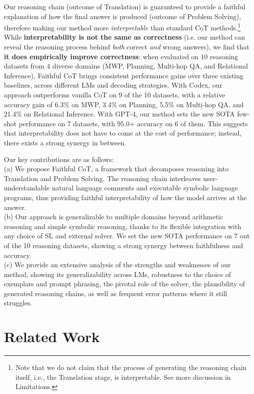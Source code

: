 \documentclass[11pt]{article}
\begin{document}
Our reasoning chain (outcome of Translation) is guaranteed to provide a faithful explanation of how the final answer is produced (outcome of Problem Solving), therefore making our method more \textit{interpretable} than standard CoT methods.\footnote{Note that we do not claim that the process of generating the reasoning chain itself, i.e., the Translation stage, is interpretable. See more discussion in Limitations.} While \textbf{interpretability is not the same as correctness}  (i.e. our method can reveal the reasoning process behind \textit{both} correct \textit{and} wrong answers), we find that \textbf{it does empirically improve correctness}: when evaluated on 10 reasoning datasets from 4 diverse domains (MWP, Planning, Multi-hop QA, and Relational Inference), Faithful CoT brings consistent performance gains over three existing baselines, across different LMs and decoding strategies. With Codex, our approach outperforms vanilla CoT on 9 of the 10 datasets, with a relative accuracy gain of 6.3\% on MWP, 3.4\% on Planning, 5.5\% on Multi-hop QA, and 21.4\% on Relational Inference. With GPT-4, our method sets the new SOTA few-shot performance on 7 datasets, with 95.0+ accuracy on 6 of them. This suggests that interpretability does not have to come at the cost of performance; instead, there exists a strong synergy in between.

Our key contributions are as follows:\\
(a) We propose Faithful CoT, a framework that decomposes reasoning into Translation and Problem Solving. The reasoning chain interleaves user-understandable natural language comments and executable symbolic language programs, thus providing faithful interpretability of how the model arrives at the answer.\\
(b) Our approach is generalizable to multiple domains beyond arithmetic reasoning and simple symbolic reasoning, thanks to its flexible integration with any choice of SL and external solver. We set the new SOTA performance on 7 out of the 10 reasoning datasets, showing a strong synergy between faithfulness and accuracy.\\
(c) We provide an extensive analysis of the strengths and weaknesses of our method, showing its generalizability across LMs, robustness to the choice of exemplars and prompt phrasing, the pivotal role of the solver, the plausibility of generated reasoning chains, as well as frequent error patterns where it still struggles.



\section{Related Work}
\label{sec:related_work}
\end{document}
